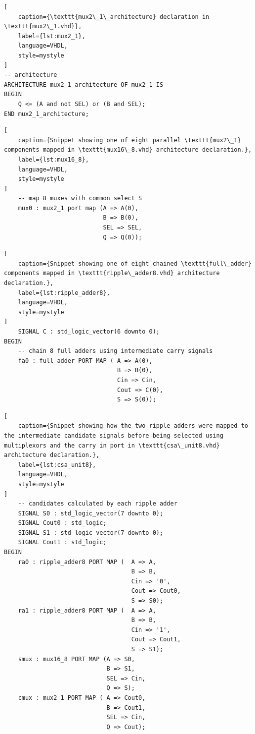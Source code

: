 \documentclass[a4paper,11pt]{article}
\begin{document}
\begin{lstlisting}[
	caption={\texttt{mux2\_1\_architecture} declaration in \texttt{mux2\_1.vhd}},
	label={lst:mux2_1},
	language=VHDL,
	style=mystyle
]
-- architecture
ARCHITECTURE mux2_1_architecture OF mux2_1 IS
BEGIN
	Q <= (A and not SEL) or (B and SEL);
END mux2_1_architecture;
\end{lstlisting}


\begin{lstlisting}[
	caption={Snippet showing one of eight parallel \texttt{mux2\_1} components mapped in \texttt{mux16\_8.vhd} architecture declaration.},
	label={lst:mux16_8},
	language=VHDL,
	style=mystyle
]
	-- map 8 muxes with common select S
	mux0 : mux2_1 port map (A => A(0),
							B => B(0),
							SEL => SEL,
							Q => Q(0));			
\end{lstlisting}

\begin{lstlisting}[
	caption={Snippet showing one of eight chained \texttt{full\_adder} components mapped in \texttt{ripple\_adder8.vhd} architecture declaration.},
	label={lst:ripple_adder8},
	language=VHDL,
	style=mystyle
]
	SIGNAL C : std_logic_vector(6 downto 0);
BEGIN
	-- chain 8 full adders using intermediate carry signals
	fa0 : full_adder PORT MAP (	A => A(0),
								B => B(0),
								Cin => Cin,
								Cout => C(0),
								S => S(0));
\end{lstlisting}

\begin{lstlisting}[
	caption={Snippet showing how the two ripple adders were mapped to the intermediate candidate signals before being selected using multiplexors and the carry in port in \texttt{csa\_unit8.vhd} architecture declaration.},
	label={lst:csa_unit8},
	language=VHDL,
	style=mystyle
]
	-- candidates calculated by each ripple adder
	SIGNAL S0 : std_logic_vector(7 downto 0);
	SIGNAL Cout0 : std_logic;
	SIGNAL S1 : std_logic_vector(7 downto 0);
	SIGNAL Cout1 : std_logic;
BEGIN
	ra0 : ripple_adder8 PORT MAP (	A => A,
									B => B,
									Cin => '0',
									Cout => Cout0,
									S => S0);
	ra1 : ripple_adder8 PORT MAP (	A => A,
									B => B,
									Cin => '1',
									Cout => Cout1,
									S => S1);
	smux : mux16_8 PORT MAP (A => S0,
							 B => S1,
							 SEL => Cin,
							 Q => S);
	cmux : mux2_1 PORT MAP ( A => Cout0,
							 B => Cout1,
							 SEL => Cin,
							 Q => Cout);
\end{lstlisting}
\end{document}
